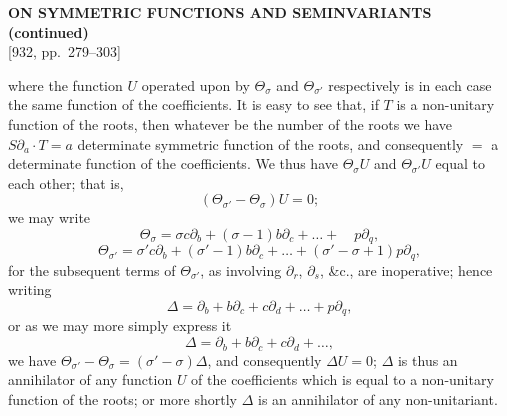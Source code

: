 \documentclass[11pt]{article}
\begin{document}
\setcounter{page}{279}

\begin{center}
{\large\bfseries ON SYMMETRIC FUNCTIONS AND SEMINVARIANTS (continued)}\\[0.4em]
{\small [932, pp.\ 279--303]}
\end{center}
\vspace{0.4em}

where the function $U$ operated upon by $\Theta_\sigma$ and $\Theta_{\sigma'}$ respectively is in each case the same function of the coefficients. It is easy to see that, if $T$ is a non-unitary function of the roots, then whatever be the number of the roots we have $S\partial_a \cdot T = a$ determinate symmetric function of the roots, and consequently $=$ a determinate function of the coefficients. We thus have $\Theta_\sigma U$ and $\Theta_{\sigma'} U$ equal to each other; that is,
\[
(\Theta_{\sigma'} - \Theta_\sigma) U = 0;
\]
we may write
\[
\Theta_\sigma = \sigma c \partial_b + (\sigma - 1) b \partial_c + \ldots + \quad p \partial_q,
\]
\[
\Theta_{\sigma'} = \sigma' c \partial_b + (\sigma' - 1) b \partial_c + \ldots + (\sigma' - \sigma + 1) p \partial_q,
\]
for the subsequent terms of $\Theta_{\sigma'}$, as involving $\partial_r$, $\partial_s$, \&c., are inoperative; hence writing
\[
\Delta = \partial_b + b \partial_c + c \partial_d + \ldots + p \partial_q,
\]
or as we may more simply express it
\[
\Delta = \partial_b + b \partial_c + c \partial_d + \ldots,
\]
we have $\Theta_{\sigma'} - \Theta_\sigma = (\sigma' - \sigma) \Delta$, and consequently $\Delta U = 0$; $\Delta$ is thus an annihilator of any function $U$ of the coefficients which is equal to a non-unitary function of the roots; or more shortly $\Delta$ is an annihilator of any non-unitariant.
\end{document}
